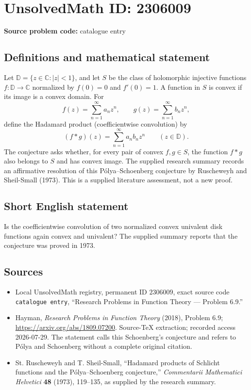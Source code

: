 \documentclass[11pt]{article}
\newcommand{\C}{\mathbb{C}}
\begin{document}
\section*{UnsolvedMath ID: 2306009}
\textbf{Source problem code:} catalogue entry
\subsection{Definitions and mathematical statement}
Let \(\mathbb D=\{z\in\C:|z|<1\}\), and let \(S\) be the class of holomorphic injective functions \(f:\mathbb D\to\C\) normalized by \(f(0)=0\) and \(f'(0)=1\). A function in \(S\) is convex if its image is a convex domain. For
\[
f(z)=\sum_{n=1}^\infty a_nz^n,\qquad
g(z)=\sum_{n=1}^\infty b_nz^n,
\]
define the Hadamard product (coefficientwise convolution) by
\[
(f*g)(z)=\sum_{n=1}^\infty a_nb_nz^n\qquad(z\in\mathbb D).
\]
The conjecture asks whether, for every pair of convex \(f,g\in S\), the function \(f*g\) also belongs to \(S\) and has convex image. The supplied research summary records an affirmative resolution of this P\'olya--Schoenberg conjecture by Ruscheweyh and Sheil-Small (1973). This is a supplied literature assessment, not a new proof.
\subsection{Short English statement}
Is the coefficientwise convolution of two normalized convex univalent disk functions again convex and univalent? The supplied summary reports that the conjecture was proved in 1973.
\subsection{Sources}
\begin{itemize}
\item Local UnsolvedMath registry, permanent ID \(2306009\), exact source code \texttt{catalogue entry}, ``Research Problems in Function Theory --- Problem 6.9.''
\item Hayman, \emph{Research Problems in Function Theory} (2018), Problem 6.9; \url{https://arxiv.org/abs/1809.07200}. Source-TeX extraction; recorded access 2026-07-29. The statement calls this Schoenberg's conjecture and refers to P\'olya and Schoenberg without a complete original citation.
\item St. Ruscheweyh and T. Sheil-Small, ``Hadamard products of Schlicht functions and the P\'olya--Schoenberg conjecture,'' \emph{Commentarii Mathematici Helvetici} \textbf{48} (1973), 119--135, as supplied by the research summary.
\end{itemize}
\end{document}
